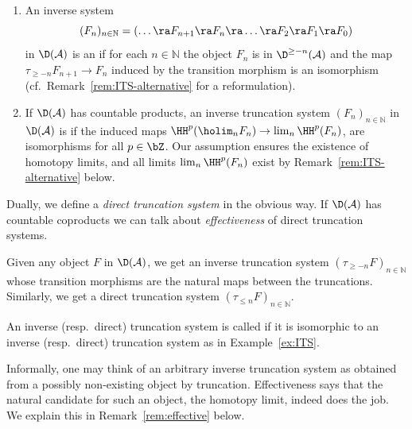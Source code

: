 \begin{definition}
\label{d:truncation-system}
\rule{0mm}{1mm}
\begin{enumerate}
\item
An inverse system 
\begin{equation*}
  (F_n)_{n \in \mathbb{N}} = 
  (\dots \ra F_{n+1} \ra F_n \ra \dots \ra F_2 \ra F_1 \ra F_0)
\end{equation*}
in $\D(\mathcal{A})$
is an  if
for each $n \in \mathbb{N}$
the object $F_n$ is in
$\D^{\geq -n}(\mathcal{A})$
and the map
$\tau_{\geq -n}F_{n+1} \to F_n$ induced by the transition
morphism is an isomorphism
(cf.\ Remark~\ref{rem:ITS-alternative} for a reformulation).
\item
If  $\D(\mathcal{A})$ has countable products, 
an inverse truncation system 
$(F_n)_{n \in \mathbb{N}}$ in $\D(\mathcal{A})$
is  if
the induced maps $\HH^p(\holim_n F_n) \to
\lim_n\HH^p(F_n)$,
are isomorphisms for all $p \in \bZ$.
Our assumption ensures the existence of homotopy limits,
and all limits $\lim_n\HH^p(F_n)$
exist by 
Remark~\ref{rem:ITS-alternative} below.  
\end{enumerate}
Dually, we define a \emph{direct truncation system} in the
obvious way. 
If $\D(\mathcal{A})$ has countable coproducts we can 
talk about 
\emph{effectiveness} of direct truncation systems.
\end{definition}

\begin{example}
  \label{ex:ITS}
  Given any object $F$ in $\D(\mathcal{A})$, we get an inverse
  truncation system $(\tau_{\geq-n}F)_{n \in \mathbb{N}}$ whose
  transition morphisms are the natural maps between the truncations.
  Similarly, we get a direct truncation system 
  $(\tau_{\leq n}F)_{n \in \mathbb{N}}$.
\end{example}

\begin{definition}
  \label{d:standardITS}
  An inverse (resp.\ direct) truncation system is called
   if it is 
  isomorphic to an inverse (resp.\ direct) truncation system as
  in Example~\ref{ex:ITS}. 
\end{definition}

\begin{remark}
  Informally, one may think of an arbitrary
  inverse truncation system as obtained from a
  possibly non-existing object by truncation. 
  Effectiveness says that the natural candidate for such an
  object, the homotopy limit,
  indeed does the job. We explain this in
  Remark~\ref{rem:effective} below.
\end{remark}

